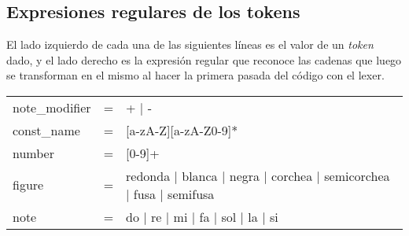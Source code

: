 \subsection{Expresiones regulares de los tokens}

El lado izquierdo de cada una de las siguientes líneas es el valor de un \textit{token} dado, y el lado derecho es la expresión regular que reconoce las cadenas que luego se transforman en el mismo al hacer la primera pasada del código con el lexer. \\

\begin{tabular}{l l l}
	note\_modifier & = & + $\vert$ - \\
	const\_name & = & [a-zA-Z][a-zA-Z0-9]* \\
	number & = & [0-9]+ \\
	figure & = & redonda $\vert$ blanca $\vert$ negra $\vert$ corchea $\vert$ semicorchea $\vert$ fusa $\vert$ semifusa \\
	note & = & do $\vert$ re $\vert$ mi $\vert$ fa $\vert$ sol $\vert$ la $\vert$ si \\
\end{tabular}
